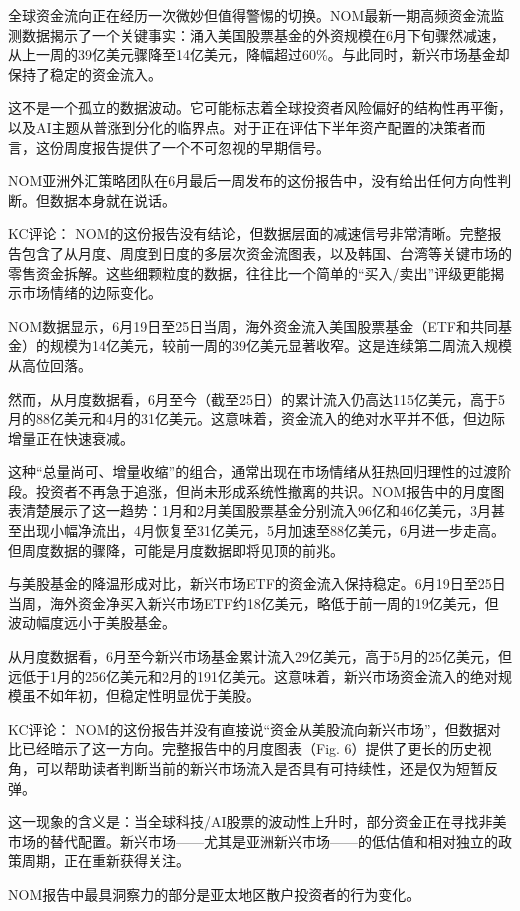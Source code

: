 \documentclass[11pt]{ctexart}
\begin{document}
全球资金流向正在经历一次微妙但值得警惕的切换。NOM最新一期高频资金流监测数据揭示了一个关键事实：涌入美国股票基金的外资规模在6月下旬骤然减速，从上一周的39亿美元骤降至14亿美元，降幅超过60\%。与此同时，新兴市场基金却保持了稳定的资金流入。

这不是一个孤立的数据波动。它可能标志着全球投资者风险偏好的结构性再平衡，以及AI主题从普涨到分化的临界点。对于正在评估下半年资产配置的决策者而言，这份周度报告提供了一个不可忽视的早期信号。

NOM亚洲外汇策略团队在6月最后一周发布的这份报告中，没有给出任何方向性判断。但数据本身就在说话。

KC评论： NOM的这份报告没有结论，但数据层面的减速信号非常清晰。完整报告包含了从月度、周度到日度的多层次资金流图表，以及韩国、台湾等关键市场的零售资金拆解。这些细颗粒度的数据，往往比一个简单的“买入/卖出”评级更能揭示市场情绪的边际变化。

NOM数据显示，6月19日至25日当周，海外资金流入美国股票基金（ETF和共同基金）的规模为14亿美元，较前一周的39亿美元显著收窄。这是连续第二周流入规模从高位回落。

然而，从月度数据看，6月至今（截至25日）的累计流入仍高达115亿美元，高于5月的88亿美元和4月的31亿美元。这意味着，资金流入的绝对水平并不低，但边际增量正在快速衰减。

这种“总量尚可、增量收缩”的组合，通常出现在市场情绪从狂热回归理性的过渡阶段。投资者不再急于追涨，但尚未形成系统性撤离的共识。NOM报告中的月度图表清楚展示了这一趋势：1月和2月美国股票基金分别流入96亿和46亿美元，3月甚至出现小幅净流出，4月恢复至31亿美元，5月加速至88亿美元，6月进一步走高。但周度数据的骤降，可能是月度数据即将见顶的前兆。

与美股基金的降温形成对比，新兴市场ETF的资金流入保持稳定。6月19日至25日当周，海外资金净买入新兴市场ETF约18亿美元，略低于前一周的19亿美元，但波动幅度远小于美股基金。

从月度数据看，6月至今新兴市场基金累计流入29亿美元，高于5月的25亿美元，但远低于1月的256亿美元和2月的191亿美元。这意味着，新兴市场资金流入的绝对规模虽不如年初，但稳定性明显优于美股。

KC评论： NOM的这份报告并没有直接说“资金从美股流向新兴市场”，但数据对比已经暗示了这一方向。完整报告中的月度图表（Fig. 6）提供了更长的历史视角，可以帮助读者判断当前的新兴市场流入是否具有可持续性，还是仅为短暂反弹。

这一现象的含义是：当全球科技/AI股票的波动性上升时，部分资金正在寻找非美市场的替代配置。新兴市场——尤其是亚洲新兴市场——的低估值和相对独立的政策周期，正在重新获得关注。

NOM报告中最具洞察力的部分是亚太地区散户投资者的行为变化。
\end{document}

